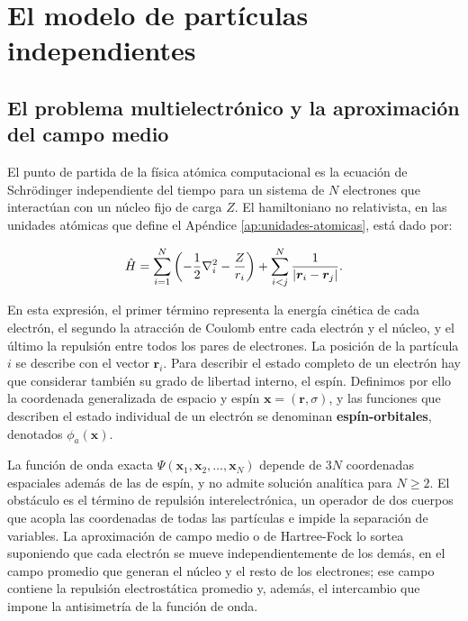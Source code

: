 \chapter{El modelo de partículas independientes}
\label{ch:particulas-independientes}

\section{El problema multielectrónico y la aproximación del campo medio}

El punto de partida de la física atómica computacional es la ecuación de Schrödinger independiente del tiempo para un sistema de \( N \) electrones que interactúan con un núcleo fijo de carga \( Z \). El hamiltoniano no relativista, en las unidades atómicas que define el Apéndice \ref{ap:unidades-atomicas}, está dado por:

\begin{equation}
  \label{eq:hamiltonian-mb}
  \hat{H} = \sum_{i=1}^N \qty(-\frac{1}{2}\laplacian_i - \frac{Z}{r_i}) + \sum_{i<j}^N \frac{1}{\abs{\bm{r}_i-\bm{r}_j}}.
\end{equation}

En esta expresión, el primer término representa la energía cinética de cada electrón, el segundo la atracción de Coulomb entre cada electrón y el núcleo, y el último la repulsión entre todos los pares de electrones. La posición de la partícula $i$ se describe con el vector $\bm{r}_i$. Para describir el estado completo de un electrón hay que considerar también su grado de libertad interno, el espín. Definimos por ello la coordenada generalizada de espacio y espín $\bm{x} = (\bm{r}, \sigma)$, y las funciones que describen el estado individual de un electrón se denominan \textbf{espín-orbitales}, denotados $\phi_a(\bm{x})$.

La función de onda exacta \( \Psi(\bm{x}_1, \bm{x}_2, \dots, \bm{x}_N) \) depende de \( 3N \) coordenadas espaciales además de las de espín, y no admite solución analítica para \( N \geq 2 \). El obstáculo es el término de repulsión interelectrónica, un operador de dos cuerpos que acopla las coordenadas de todas las partículas e impide la separación de variables. La aproximación de campo medio o de Hartree-Fock lo sortea suponiendo que cada electrón se mueve independientemente de los demás, en el campo promedio que generan el núcleo y el resto de los electrones; ese campo contiene la repulsión electrostática promedio y, además, el intercambio que impone la antisimetría de la función de onda.

